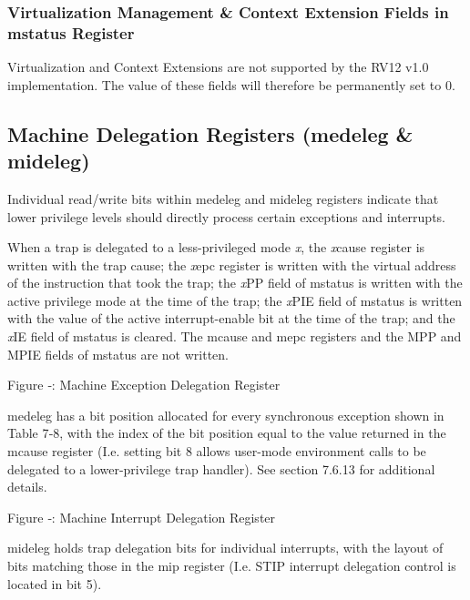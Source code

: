 \subsubsection{Virtualization Management \& Context Extension Fields in
mstatus Register
}\label{virtualization-management-context-extension-fields-in-mstatus-register}

Virtualization and Context Extensions are not supported by the RV12 v1.0
implementation. The value of these fields will therefore be permanently
set to 0.

\subsection{Machine Delegation Registers
(medeleg \& mideleg)} \label{machine-exception-interrupt-delegation-registers-medeleg-mideleg}

Individual read/write bits within medeleg and mideleg registers indicate
that lower privilege levels should directly process certain exceptions
and interrupts.

When a trap is delegated to a less-privileged mode \emph{x}, the
\emph{x}cause register is written with the trap cause; the \emph{x}epc
register is written with the virtual address of the instruction that
took the trap; the \emph{x}PP field of mstatus is written with the
active privilege mode at the time of the trap; the \emph{x}PIE field of
mstatus is written with the value of the active interrupt-enable bit at
the time of the trap; and the \emph{x}IE field of mstatus is cleared.
The mcause and mepc registers and the MPP and MPIE fields of mstatus are
not written.

\missingfigure{}

\protect\hypertarget{_Ref367088718}{}{}Figure ‑: Machine Exception
Delegation Register

medeleg has a bit position allocated for every synchronous exception
shown in Table 7‑8, with the index of the bit position equal to the
value returned in the mcause register (I.e. setting bit 8 allows
user-mode environment calls to be delegated to a lower-privilege trap
handler). See section 7.6.13 for additional details.

\missingfigure{}

\protect\hypertarget{_Ref367088721}{}{}Figure ‑: Machine Interrupt
Delegation Register

mideleg holds trap delegation bits for individual interrupts, with the
layout of bits matching those in the mip register (I.e. STIP interrupt
delegation control is located in bit 5).

